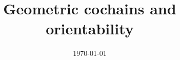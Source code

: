 \documentclass{amsart}
\title{Geometric cochains and orientability}
\date{\today}
\begin{document}
	
	\maketitle
	
	
	
	
	
	
	
	\sloppy
	\printbibliography
	
	\todos
\end{document}
